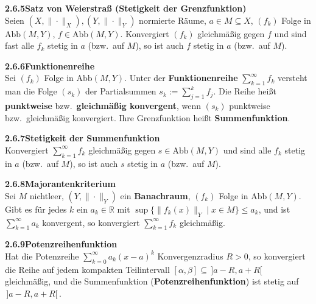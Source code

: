 \documentclass[a4paper,12pt]{article}
\newcommand{\gentry}[3]{%
  \noindent\textbf{#1\quad #2}\nopagebreak\\[0.2em]
  #3\par\smallskip
}
\begin{document}
\gentry{2.6.5}{Satz von Weierstraß (Stetigkeit der Grenzfunktion)}{%
  Seien $(X, \|\cdot\|_X), (Y, \|\cdot\|_Y)$ normierte Räume, $a \in M \subseteq X$,
  $(f_k)$ Folge in $\mathrm{Abb}(M, Y)$, $f \in \mathrm{Abb}(M, Y)$.
  Konvergiert $(f_k)$ gleichmäßig gegen $f$ und sind fast alle $f_k$ stetig in
  $a$ (bzw.\ auf $M$), so ist auch $f$ stetig in $a$ (bzw.\ auf $M$).
}

\gentry{2.6.6}{Funktionenreihe}{%
  Sei $(f_k)$ Folge in $\mathrm{Abb}(M, Y)$. Unter der \textbf{Funktionenreihe}
  $\sum_{k=1}^\infty f_k$ versteht man die Folge $(s_k)$ der Partialsummen
  $s_k := \sum_{j=1}^k f_j$. Die Reihe heißt \textbf{punktweise} bzw.\
  \textbf{gleichmäßig konvergent}, wenn $(s_k)$ punktweise bzw.\ gleichmäßig
  konvergiert. Ihre Grenzfunktion heißt \textbf{Summenfunktion}.
}

\gentry{2.6.7}{Stetigkeit der Summenfunktion}{%
  Konvergiert $\sum_{k=1}^\infty f_k$ gleichmäßig gegen $s \in \mathrm{Abb}(M, Y)$
  und sind alle $f_k$ stetig in $a$ (bzw.\ auf $M$), so ist auch $s$ stetig in $a$
  (bzw.\ auf $M$).
}

\gentry{2.6.8}{Majorantenkriterium}{%
  Sei $M$ nichtleer, $(Y, \|\cdot\|_Y)$ ein \textbf{Banachraum}, $(f_k)$ Folge in
  $\mathrm{Abb}(M, Y)$. Gibt es für jedes $k$ ein $a_k \in \mathbb{R}$ mit
  $\sup\{\|f_k(x)\|_Y \mid x \in M\} \leq a_k$, und ist $\sum_{k=1}^\infty a_k$
  konvergent, so konvergiert $\sum_{k=1}^\infty f_k$ gleichmäßig.
}

\gentry{2.6.9}{Potenzreihenfunktion}{%
  Hat die Potenzreihe $\sum_{k=0}^\infty a_k(x - a)^k$ Konvergenzradius $R > 0$,
  so konvergiert die Reihe auf jedem kompakten Teilintervall
  $[\alpha, \beta] \subseteq \,]a - R, a + R[\,$ gleichmäßig, und die
  Summenfunktion (\textbf{Potenzreihenfunktion}) ist stetig auf
  $\,]a - R, a + R[\,$.
}
\end{document}
